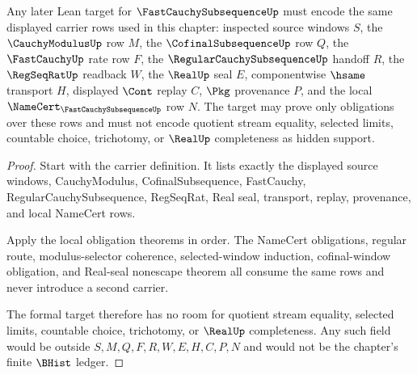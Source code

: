\begin{theorem}
\label{thm:fast-cauchy-subsequence-formal-target-ledger}
Any later Lean target for $\FastCauchySubsequenceUp$ must encode the same displayed carrier rows used in this chapter: inspected source windows $S$, the $\CauchyModulusUp$ row $M$, the $\CofinalSubsequenceUp$ row $Q$, the $\FastCauchyUp$ rate row $F$, the $\RegularCauchySubsequenceUp$ handoff $R$, the $\RegSeqRatUp$ readback $W$, the $\RealUp$ seal $E$, componentwise $\hsame$ transport $H$, displayed $\Cont$ replay $C$, $\Pkg$ provenance $P$, and the local $\NameCert_{\FastCauchySubsequenceUp}$ row $N$. The target may prove only obligations over these rows and must not encode quotient stream equality, selected limits, countable choice, trichotomy, or $\RealUp$ completeness as hidden support.
\end{theorem}
\begin{proof}
Start with the carrier definition. It lists exactly the displayed source windows, CauchyModulus, CofinalSubsequence, FastCauchy, RegularCauchySubsequence, RegSeqRat, Real seal, transport, replay, provenance, and local NameCert rows.

Apply the local obligation theorems in order. The NameCert obligations, regular route, modulus-selector coherence, selected-window induction, cofinal-window obligation, and Real-seal nonescape theorem all consume the same rows and never introduce a second carrier.

The formal target therefore has no room for quotient stream equality, selected limits, countable choice, trichotomy, or $\RealUp$ completeness. Any such field would be outside $S,M,Q,F,R,W,E,H,C,P,N$ and would not be the chapter's finite $\BHist$ ledger.
\end{proof}

